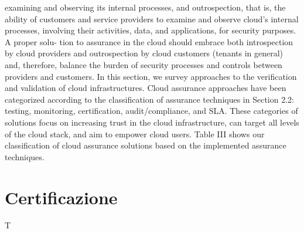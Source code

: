 \documentclass[../main.tex]{subfiles}
\begin{document}
examining and observing its internal processes, and outrospection, that is, the ability
of customers and service providers to examine and observe cloud’s internal processes,
involving their activities, data, and applications, for security purposes. A proper solu-
tion to assurance in the cloud should embrace both introspection by cloud providers
and outrospection by cloud customers (tenants in general) and, therefore, balance the
burden of security processes and controls between providers and customers.
In this section, we survey approaches to the verification and validation of cloud
infrastructures. Cloud assurance approaches have been categorized according to the
classification of assurance techniques in Section 2.2: testing, monitoring, certification,
audit/compliance, and SLA. These categories of solutions focus on increasing trust in
the cloud infrastructure, can target all levels of the cloud stack, and aim to empower
cloud users. Table III shows our classification of cloud assurance solutions based on
the implemented assurance techniques.


\section{Certificazione}

T%
\end{document}

